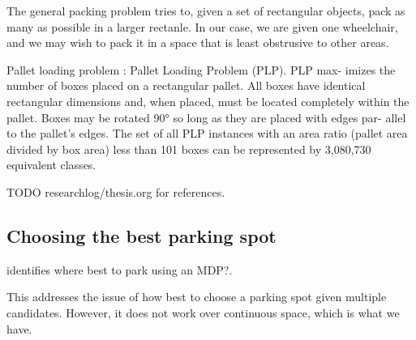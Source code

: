 The general packing
problem tries to, given a set of rectangular objects, pack as many as possible
in a larger rectanle. In our case, we are given one wheelchair, and we may wish
to pack it in a space that is least obstrusive to other areas.

Pallet loading problem \cite{martins2008solving}:
Pallet Loading Problem (PLP). PLP max- imizes the number of boxes placed on a
rectangular pallet. All boxes have identical rectangular dimensions and, when
placed, must be located completely within the pallet. Boxes may be rotated 90°
so long as they are placed with edges par- allel to the pallet’s edges. The set
of all PLP instances with an area ratio (pallet area divided by box area) less
than 101 boxes can be represented by 3,080,730 equivalent classes.


TODO researchlog/thesis.org for references.


% 
% 
% 
% 
% 
% 
% 


\subsection{Choosing the best parking spot}
\cite{bogoslavskyi2015where} identifies where best to park using an MDP?.

This addresses the issue of how best to choose a parking spot given multiple
candidates. However, it does not work over continuous space, which is what we
have.

